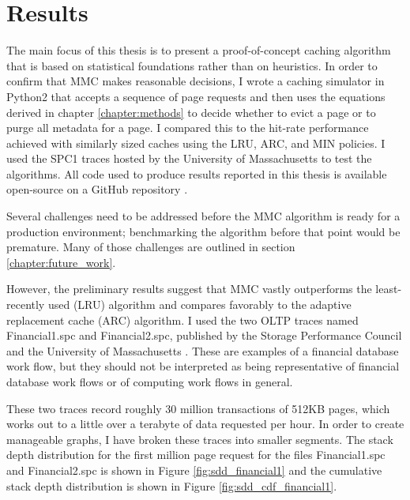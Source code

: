 \chapter{Results}
\label{chapter:results}

  The main focus of this thesis is to present a proof-of-concept caching
  algorithm that is based on statistical foundations rather than on heuristics.
  In order to confirm that MMC makes reasonable decisions, I wrote a
  caching simulator in Python2 that accepts a sequence of page requests and
  then uses the equations derived in chapter \ref{chapter:methods} to decide
  whether to evict a page or to purge all metadata for a page. I compared this
  to the hit-rate performance achieved with similarly sized caches using the
  LRU, ARC, and MIN policies. I used the SPC1 traces hosted by the University of
  Massachusetts \cite{SPC1} to test the algorithms. All code used to produce
  results reported in this thesis is available open-source on a GitHub
  repository \cite{supplimental}.

  Several challenges need to be addressed before the MMC algorithm is ready for
  a production environment; benchmarking the algorithm before that point would
  be premature. Many of those challenges are outlined in section
  \ref{chapter:future_work}.

  However, the preliminary results suggest that MMC vastly outperforms the
  least-recently used (LRU) algorithm and compares favorably to the adaptive
  replacement cache (ARC) algorithm. I used the two OLTP traces named
  Financial1.spc and Financial2.spc, published by the Storage Performance Council
  and the University of Massachusetts \cite{SPC1, OLTPtraces}. These are
  examples of a financial database work flow, but they should not be interpreted
  as being representative of financial database work flows or of computing
  work flows in general.

  These two traces record roughly 30 million transactions of 512KB pages, which
  works out to a little over a terabyte of data requested per hour. In order to
  create manageable graphs, I have broken these traces into smaller segments.
  The stack depth distribution for the first million page request for the files
  Financial1.spc and Financial2.spc is shown in Figure \ref{fig:sdd_financial1}
  and the cumulative stack depth distribution is shown in Figure
  \ref{fig:sdd_cdf_financial1}.

